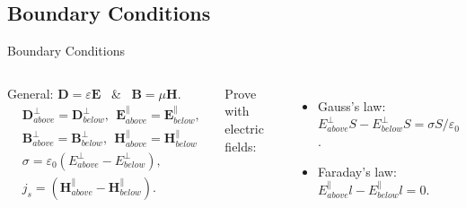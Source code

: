 \subsection{Boundary Conditions}

\begin{frame}{Boundary Conditions}

\begin{columns}
    General: \( \mathbf{D} = \varepsilon \mathbf{E} \) \ \& \ \( \mathbf{B} = \mu \mathbf{H} \).
    \begin{align*}
        & \mathbf{D}_{above}^{\perp} = \mathbf{D}_{below}^{\perp}, \ \ \mathbf{E}_{above}^{\parallel} = \mathbf{E}_{below}^{\parallel}, \\
        & \mathbf{B}_{above}^{\perp} = \mathbf{B}_{below}^{\perp}, \ \ \mathbf{H}_{above}^{\parallel} = \mathbf{H}_{below}^{\parallel} \\
        &\sigma = \varepsilon_0 \left( E_{above}^{\perp} -E_{below}^{\perp} \right), \\
        &j_s = \left( \mathbf{H}_{above}^{\parallel} - \mathbf{H}_{below}^{\parallel} \right).
    \end{align*}

    Prove with electric fields:
    \begin{itemize}
        \item Gauss's law: 
        \( E_{above}^{\perp} S  - E_{below}^{\perp} S = \sigma S / \varepsilon_0 \).
        \item Faraday's law: 
        \( E_{above}^{\parallel} l  - E_{below}^{\parallel} l = 0 \).
    \end{itemize}


\end{columns}
\end{frame}
